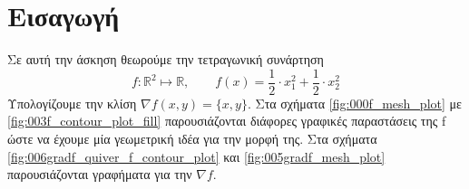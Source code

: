 \chapter{Εισαγωγή} \label{intro}

Σε αυτή την άσκηση θεωρούμε την τετραγωνική συνάρτηση
\begin{equation*}
	f:\mathbb{R}^{2} \mapsto \mathbb{R}, \qquad f(x) = \frac{1}{2} \cdot x_1 ^ 2 + \frac{1}{2} \cdot x_2^2
\end{equation*}
Υπολογίζουμε την κλίση $\nabla f(x, y) = \{x, y\}$. \newline
Στα σχήματα \ref{fig:000f_mesh_plot} με \ref{fig:003f_contour_plot_fill} παρουσιάζονται διάφορες γραφικές παραστάσεις της f ώστε να έχουμε μία γεωμετρική ιδέα για την μορφή της. Στα σχήματα \ref{fig:006gradf_quiver_f_contour_plot} και \ref{fig:005gradf_mesh_plot} παρουσιάζονται γραφήματα για την $\nabla f$.

